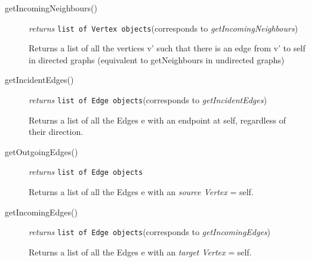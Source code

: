 \begin{description}
\label{getIncomingNeighboursClass}\item[getIncomingNeighbours()]\emph{returns} \texttt{list of Vertex objects}\quad(corresponds to \textit{getIncomingNeighbours})

Returns a list of all the vertices v' such that there is an edge from v' to self in directed graphs (equivalent to getNeighbours in undirected graphs)

\label{getIncidentEdgesClass}\item[getIncidentEdges()]\emph{returns} \texttt{list of Edge objects}\quad(corresponds to \textit{getIncidentEdges})


Returns a list of all the Edges e with an endpoint at self, regardless of their direction.

\item[getOutgoingEdges()]\emph{returns}
  \texttt{list of Edge objects}

Returns a list of all the Edges e with an \textit{source Vertex} = self.

\label{getIncomingEdgesClass}\item[getIncomingEdges()]\emph{returns} \texttt{list of Edge objects}\quad(corresponds to \textit{getIncomingEdges})

Returns a list of all the Edges e with an \textit{target Vertex} = self.

\end{description}
